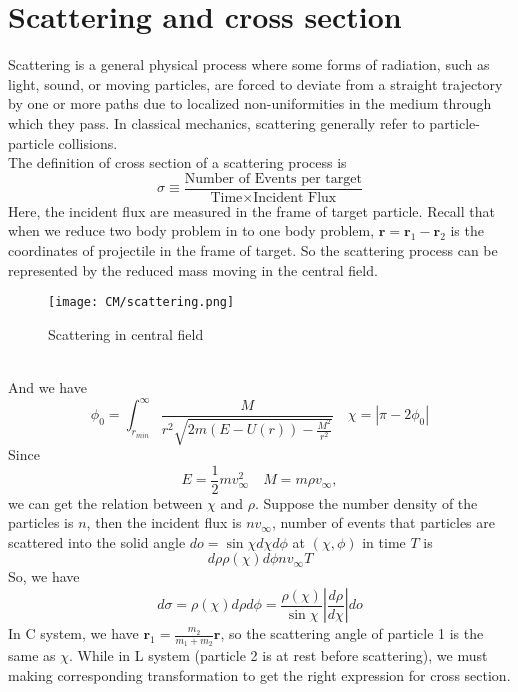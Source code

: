 \documentclass[cyan]{elegantnote}
\begin{document}
\section{Scattering and cross section}
Scattering is a general physical process where some forms of radiation, such as light, sound, or moving particles, are forced to deviate from a straight trajectory by one or more paths due to localized non-uniformities in the medium through which they pass.  In classical mechanics, scattering generally refer to particle-particle collisions. \\
The definition of cross section  of a scattering process is
\[\sigma \equiv \frac{\mbox{Number of Events per target}}{\mbox{Time} \times \mbox{Incident Flux}}\]
Here, the incident flux are measured in the frame of target particle. Recall that when we reduce two body problem in to one body problem, $\bm{r} = \bm{r}_1 - \bm{r}_2$ is the coordinates of projectile in the frame of target. So the scattering process can be represented by the reduced mass moving in the central field. 
\begin{figure}[!h]
	\centering
	\texttt{[image: CM/scattering.png]}
	\caption{Scattering in central field}
\end{figure}\\
And we have
\[\phi_0 = \int_{r_{min}}^{\infty} \frac{M}{r^2 \sqrt{2m(E-U(r))-\frac{M^2}{r^2}}} \quad \chi = |\pi - 2\phi_0|\]
Since
\[E = \frac{1}{2}m v_{\infty}^2 \quad M = m\rho v_{\infty},\]
we can get the relation between  $\chi$ and $\rho$. Suppose the number density of the particles is $n$, then the incident flux is $nv_{\infty}$, number of events that particles are scattered into the solid angle $do = \sin\chi d\chi d\phi$ at $(\chi,\phi)$ in time $T$ is
\[d\rho \rho(\chi) d\phi nv_{\infty} T \]
So, we have
\[d\sigma = \rho(\chi) d\rho d\phi = \frac{\rho(\chi)}{\sin\chi} \left| \frac{d\rho}{d\chi} \right| do\]
In C system, we have $\bm{r}_1 = \frac{m_2}{m_1+m_2} \bm{r}$, so the scattering angle of particle 1 is the same as $\chi$. While in L system (particle 2 is at rest before scattering), we must making corresponding transformation to get the right expression for cross section.
\end{document}

